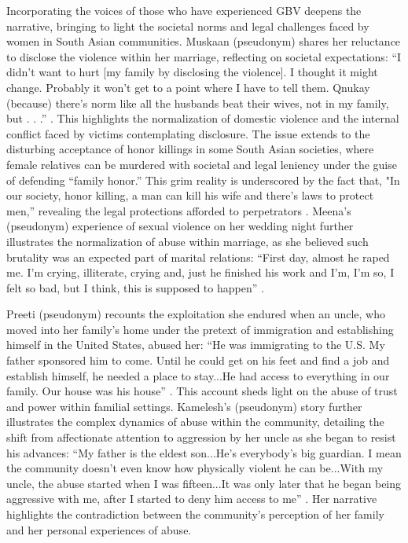 \documentclass[manuscript,screen]{acmart}
\begin{document}
Incorporating the voices of those who have experienced GBV deepens the narrative, bringing to light the societal norms and legal challenges faced by women in South Asian communities. Muskaan (pseudonym) shares her reluctance to disclose the violence within her marriage, reflecting on societal expectations: “I didn’t want to hurt [my family by disclosing the violence]. I thought it might change. Probably it won’t get to a point where I have to tell them. Qnukay (because) there’s norm like all the husbands beat their wives, not in my family, but . . .” \cite{21}. This highlights the normalization of domestic violence and the internal conflict faced by victims contemplating disclosure. The issue extends to the disturbing acceptance of honor killings in some South Asian societies, where female relatives can be murdered with societal and legal leniency under the guise of defending “family honor.” This grim reality is underscored by the fact that, "In our society, honor killing, a man can kill his wife and there’s laws to protect men,” revealing the legal protections afforded to perpetrators \cite{21}. Meena’s (pseudonym) experience of sexual violence on her wedding night further illustrates the normalization of abuse within marriage, as she believed such brutality was an expected part of marital relations: “First day, almost he raped me. I’m crying, illiterate, crying and, just he finished his work and I’m, I’m so, I felt so bad, but I think, this is supposed to happen” \cite{21}.

Preeti (pseudonym) recounts the exploitation she endured when an uncle, who moved into her family’s home under the pretext of immigration and establishing himself in the United States, abused her: “He was immigrating to the U.S. My father sponsored him to come. Until he could get on his feet and find a job and establish himself, he needed a place to stay...He had access to everything in our family. Our house was his house” \cite{21}. This account sheds light on the abuse of trust and power within familial settings. Kamelesh’s (pseudonym) story further illustrates the complex dynamics of abuse within the community, detailing the shift from affectionate attention to aggression by her uncle as she began to resist his advances: “My father is the eldest son...He’s everybody’s big guardian. I mean the community doesn’t even know how physically violent he can be...With my uncle, the abuse started when I was fifteen...It was only later that he began being aggressive with me, after I started to deny him access to me” \cite{21}. Her narrative highlights the contradiction between the community's perception of her family and her personal experiences of abuse.
\end{document}
